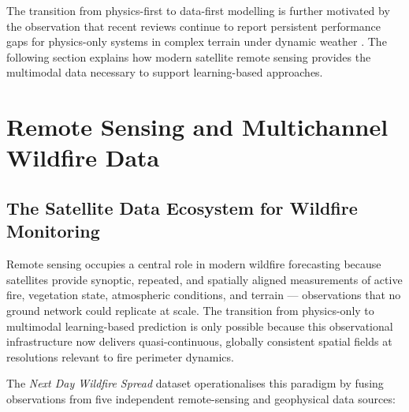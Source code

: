
The transition from physics-first to data-first modelling is further motivated by the observation that recent reviews continue to report persistent performance gaps for physics-only systems in complex terrain under dynamic weather \citep{singh2024physmlreview}.
The following section explains how modern satellite remote sensing provides the multimodal data necessary to support learning-based approaches.

\section{Remote Sensing and Multichannel Wildfire Data}
\label{sec:sota_remote_sensing}

\subsection{The Satellite Data Ecosystem for Wildfire Monitoring}

Remote sensing occupies a central role in modern wildfire forecasting because satellites provide synoptic, repeated, and spatially aligned measurements of active fire, vegetation state, atmospheric conditions, and terrain — observations that no ground network could replicate at scale.
The transition from physics-only to multimodal learning-based prediction is only possible because this observational infrastructure now delivers quasi-continuous, globally consistent spatial fields at resolutions relevant to fire perimeter dynamics.

The \textit{Next Day Wildfire Spread} dataset \citep{huot2022next} operationalises this paradigm by fusing observations from five independent remote-sensing and geophysical data sources:

